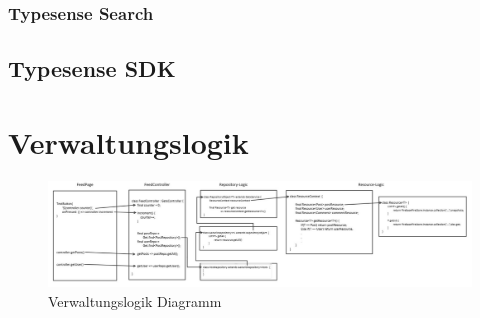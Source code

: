 \subsubsection{Typesense Search}
\subsection{Typesense SDK}

\section{Verwaltungslogik}

\begin{figure}[h]
  \centering
  \includegraphics[width=1\textwidth]{pics/Repository-Resource-Diagram.jpg}
  \caption{Verwaltungslogik Diagramm}
\end{figure}

